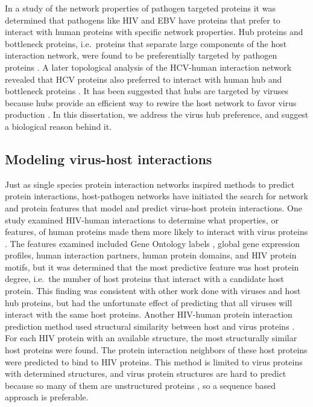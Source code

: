 In a study of the network properties of pathogen targeted proteins it
was determined that pathogens like HIV and EBV have proteins that
prefer to interact with human proteins with specific network
properties. Hub proteins and bottleneck proteins, i.e.\ proteins that
separate large components of the host interaction network, were found
to be preferentially targeted by pathogen proteins \cite{dyer08}. A
later topological analysis of the HCV-human interaction network
revealed that HCV proteins also preferred to interact with human hub
and bottleneck proteins \cite{dechassey08}. It has been suggested that
hubs are targeted by viruses because hubs provide an efficient way to
rewire the host network to favor virus production
\cite{calderwood07}. In this dissertation, we address the virus hub
preference, and suggest a biological reason behind it.


\subsection{Modeling virus-host interactions}

Just as single species protein interaction networks inspired methods
to predict protein interactions, host-pathogen networks have initiated
the search for network and protein features that model and predict
virus-host protein interactions. One study examined HIV-human
interactions to determine what properties, or features, of human
proteins made them more likely to interact with virus proteins
\cite{tastan09}. The features examined included Gene Ontology labels
\cite{ashburner00}, global gene expression profiles, human interaction
partners, human protein domains, and HIV protein motifs, but it was
determined that the most predictive feature was host protein degree,
i.e.\ the number of host proteins that interact with a candidate host
protein. This finding was consistent with other work done with viruses
and host hub proteins, but had the unfortunate effect of predicting
that all viruses will interact with the same host proteins. Another
HIV-human protein interaction prediction method used structural
similarity between host and virus proteins
\cite{doolittle2010structural}. For each HIV protein with an available
structure, the most structurally similar host proteins were found. The
protein interaction neighbors of these host proteins were predicted to
bind to HIV proteins. This method is limited to virus proteins with
determined structures, and virus protein structures are hard to
predict because so many of them are unstructured proteins
\cite{tokuriki2009viral}, so a sequence based approach is preferable.

